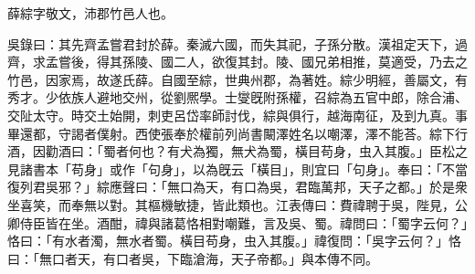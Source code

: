 
\begin{pinyinscope}
薛綜字敬文，沛郡竹邑人也。

吳錄曰：其先齊孟嘗君封於薛。秦滅六國，而失其祀，子孫分散。漢祖定天下，過齊，求孟嘗後，得其孫陵、國二人，欲復其封。陵、國兄弟相推，莫適受，乃去之竹邑，因家焉，故遂氏薛。自國至綜，世典州郡，為著姓。綜少明經，善屬文，有秀才。少依族人避地交州，從劉熈學。士燮旣附孫權，召綜為五官中郎，除合浦、交阯太守。時交土始開，刺吏呂岱率師討伐，綜與俱行，越海南征，及到九真。事畢還都，守謁者僕射。西使張奉於權前列尚書闞澤姓名以嘲澤，澤不能荅。綜下行酒，因勸酒曰：「蜀者何也？有犬為獨，無犬為蜀，橫目苟身，虫入其腹。」臣松之見諸書本「苟身」或作「句身」，以為旣云「橫目」，則宜曰「句身」。奉曰：「不當復列君吳邪？」綜應聲曰：「無口為天，有口為吳，君臨萬邦，天子之都。」於是衆坐喜笑，而奉無以對。其樞機敏捷，皆此類也。江表傳曰：費禕聘于吳，陛見，公卿侍臣皆在坐。酒酣，禕與諸葛恪相對嘲難，言及吳、蜀。禕問曰：「蜀字云何？」恪曰：「有水者濁，無水者蜀。橫目苟身，虫入其腹。」禕復問：「吳字云何？」恪曰：「無口者天，有口者吳，下臨滄海，天子帝都。」與本傳不同。


\end{pinyinscope}
